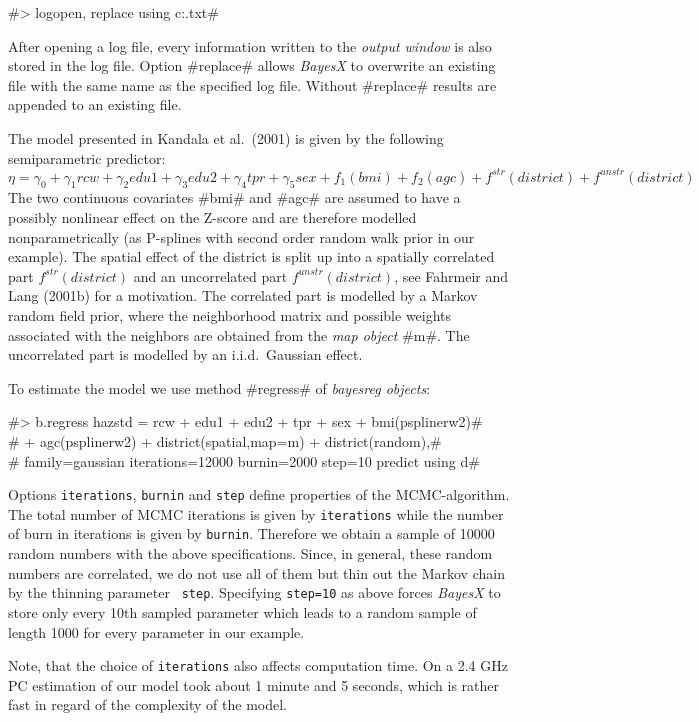 \documentclass[11pt,a4paper,twoside]{bayesxreport}
\begin{document}
#> logopen, replace using c:\data\logmcmc.txt#

After opening a log file, every information written to the {\em
output window} is also stored in the log file. Option #replace#
allows {\it BayesX} to overwrite an existing file with the same name
as the specified log file. Without #replace# results are appended to
an existing file.

The model presented in Kandala et al.~(2001) is given by the
following semiparametric predictor:
\[\eta=\gamma_0+\gamma_1rcw+\gamma_2edu1+\gamma_3edu2+\gamma_4tpr+\gamma_5sex+f_1(bmi)+f_2(agc)+f^{str}(district)+f^{unstr}(district)\]
The two continuous covariates #bmi# and #agc# are assumed to have a
possibly nonlinear effect on the Z-score and are therefore modelled
nonparametrically (as P-splines with second order random walk prior
in our example). The spatial effect of the district is split up into
a spatially correlated part $ f^{str}(district)$ and an uncorrelated
part $f^{unstr}(district)$, see Fahrmeir and Lang (2001b) for a
motivation. The correlated part is modelled by a Markov random field
prior, where the neighborhood matrix and possible weights associated
with the neighbors are obtained from the {\it map object} #m#. The
uncorrelated part is modelled by an i.i.d.~Gaussian effect.

To estimate the model we use method #regress# of {\em bayesreg
objects}:

 #> b.regress hazstd = rcw + edu1 + edu2 + tpr + sex + bmi(psplinerw2)#\\
 #  + agc(psplinerw2) + district(spatial,map=m) + district(random),#\\
 #  family=gaussian iterations=12000 burnin=2000 step=10 predict using d#

Options {\tt iterations}, {\tt burnin} and {\tt step} define
properties of the MCMC-algorithm. The total number of MCMC
iterations is given by {\tt iterations} while the number of burn in
iterations is given by {\tt burnin}. Therefore we obtain a sample of
10000 random numbers with the above specifications. Since, in
general, these random numbers are correlated, we do not use all of
them but thin out the Markov chain by the thinning parameter {\tt
step}. Specifying {\tt step=10} as above forces {\em BayesX} to
store only every 10th sampled parameter which leads to a random
sample of length 1000 for every parameter in our example.

Note, that the choice of {\tt iterations} also affects computation
time. On a 2.4 GHz PC estimation of our model took about 1 minute
and 5 seconds, which is rather fast in regard of the complexity of
the model.
\end{document}
